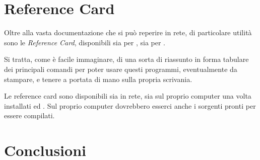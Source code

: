 \documentclass[10pt,a4paper]{article}
\begin{document}

\section{Reference Card}
\label{sec:refcard}

Oltre alla vasta documentazione che si può reperire in rete, di 
particolare utilità sono le \emph{Reference Card}, disponibili sia per
\emacs{}, sia per \auctex{}.

Si tratta, come è facile immaginare, di una sorta di riassunto in
forma tabulare dei principali comandi per poter usare questi
programmi,  eventualmente  da stampare, e tenere a portata di mano
sulla  propria scrivania.

Le reference card sono disponibili sia in rete, sia sul proprio
computer una volta installati \emacs{} ed \auctex. Sul proprio
computer dovrebbero esserci anche i sorgenti pronti per essere compilati.

\section{Conclusioni}
\label{sec:fine}

\lipsum[1]


\end{document}
